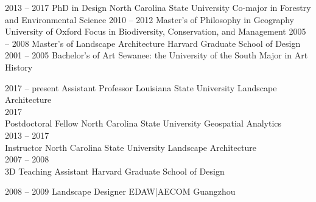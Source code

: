 \documentclass[10pt]{developercv} %
\begin{document}

\begin{entrylist}
	\entry
		{2013 -- 2017}
		{PhD in Design}
		{North Carolina State University}
		{Co-major in Forestry and Environmental Science}
	\entry
		{2010 -- 2012}
		{Master's of Philosophy in Geography} %
		{University of Oxford}
		{Focus in Biodiversity, Conservation, and Management}
	\entry
		{2005 -- 2008}
		{Master's of Landscape Architecture}
		{Harvard Graduate School of Design}
		{}
	\entry
		{2001 -- 2005}
		{Bachelor's of Art}
		{Sewanee: the University of the South}
		{Major in Art History}
\end{entrylist}



\begin{entrylist}
	\entry
		{2017 -- present}
		{Assistant Professor}
		{Louisiana State University}
		{Landscape Architecture\\
		}
	\entry
		{2017\\\footnotesize{}}
		{Postdoctoral Fellow}
		{North Carolina State University}
		{Geospatial Analytics\\
		}
	\entry
		{2013 -- 2017\\\footnotesize{}}
		{Instructor}
		{North Carolina State University}
		{Landscape Architecture\\
		}
	\entry
		{2007 -- 2008\\\footnotesize{}}
		{3D Teaching Assistant}
		{Harvard Graduate School of Design}
		{%
		}
\end{entrylist}


\begin{entrylist}
	\entry
		{2008 -- 2009}
		{Landscape Designer}
		{EDAW|AECOM Guangzhou}
		{%
		}
\end{entrylist}
\end{document}
